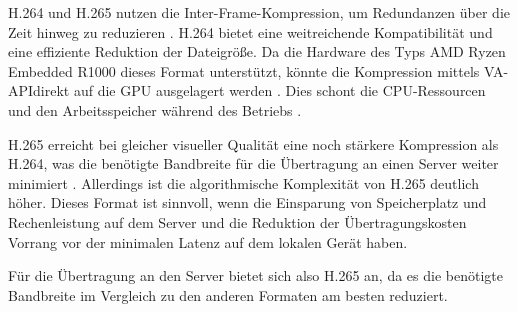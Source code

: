 H.264 und H.265 nutzen die Inter-Frame-Kompression, um Redundanzen über die Zeit hinweg zu reduzieren \parencite{putra_2023_interframe}. H.264 bietet eine weitreichende Kompatibilität und eine 
effiziente Reduktion der Dateigröße\parencite{kalva_the}. Da die Hardware des Typs AMD Ryzen Embedded R1000 dieses Format unterstützt, könnte die Kompression 
mittels VA-APIdirekt auf die GPU ausgelagert werden \parencite{_2026_ffmpeg, gpuopenlibrariessdks_2025_amf_video_encode_api}. Dies schont die CPU-Ressourcen und den Arbeitsspeicher während des Betriebs \parencite{_2025_amd}.\newline

H.265 erreicht bei gleicher visueller Qualität eine noch stärkere Kompression als H.264, was die benötigte Bandbreite für die Übertragung an einen Server weiter minimiert \parencite{putra_2023_interframe}. Allerdings ist 
die algorithmische Komplexität von H.265 deutlich höher. Dieses Format ist sinnvoll, wenn die Einsparung von Speicherplatz und Rechenleistung auf dem Server und die Reduktion der Übertragungskosten Vorrang vor der minimalen Latenz auf dem lokalen Gerät haben.\newline

Für die Übertragung an den Server bietet sich also H.265 an, da es die benötigte Bandbreite im Vergleich zu den anderen Formaten am besten reduziert.

\vspace{1em}
